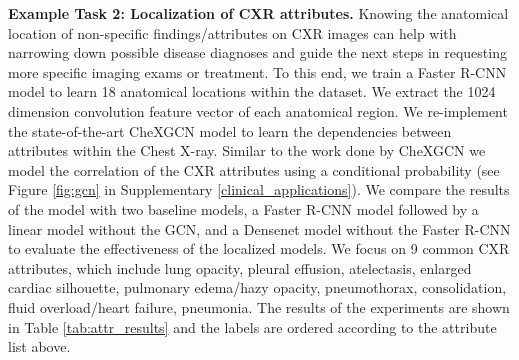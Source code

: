  \textbf{Example Task 2: Localization of CXR attributes.} Knowing the anatomical location of non-specific findings/attributes on CXR images can help with narrowing down possible disease diagnoses and guide the next steps in requesting more specific imaging exams or treatment. To this end, we train a Faster R-CNN model \cite{ren2015faster} %
to learn 18 anatomical locations within the dataset. We extract the 1024 dimension convolution feature vector of each anatomical region. We re-implement the state-of-the-art CheXGCN model \cite{chen2020label} %
to learn the dependencies between attributes within the Chest X-ray. 
Similar to the work done by CheXGCN we model the correlation of the CXR attributes using a conditional probability (see Figure \ref{fig:gcn} in Supplementary \ref{clinical_applications}). We compare the results of the model with two baseline models, a Faster R-CNN model followed by a linear model without the GCN, and a Densenet model \cite{huang2017densely} without the Faster R-CNN to evaluate the effectiveness of the localized models. We focus on 9 common CXR attributes, which include lung opacity, pleural effusion, atelectasis, enlarged cardiac silhouette, pulmonary edema/hazy opacity, pneumothorax, consolidation, fluid overload/heart failure, pneumonia. The results of the experiments are shown in Table \ref{tab:attr_results} and the labels are ordered according to the attribute list above. 


\begin{table}[t!]
\centering
\caption{Anatomically localized CXR attribute detection (AUC scores). L1: Lung Opacity, L2: Pleural Effusion, L3: Atelectasis, L4: Enlarged Cardiac Silhouette, L5: Pulmonary Edema/Hazy Opacity, L6: Pneumothorax, L7: Consolidation, L8: Fluid Overload/Heart Failure, L9: Pneumonia.}
\label{tab:attr_results}
\vspace{-15pt}
\end{table}

